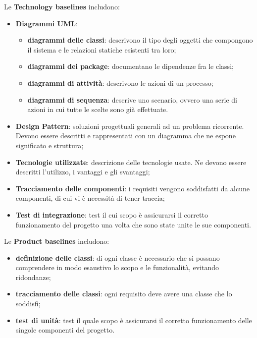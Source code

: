 Le \textbf{Technology baselines} includono:
\begin{itemize}
\item \textbf{Diagrammi UML}:
\begin{itemize}
\item \textbf{diagrammi delle classi}: descrivono il tipo degli oggetti che compongono il sistema e le relazioni statiche esistenti tra loro;
\item \textbf{diagrammi dei package}: documentano le dipendenze fra le classi;
\item \textbf{diagrammi di attività}: descrivono le azioni di un processo;
\item \textbf{diagrammi di sequenza}: descrive uno scenario, ovvero una serie di azioni in cui tutte le scelte sono già effettuate.
\end{itemize}
\item \textbf{Design Pattern}: soluzioni progettuali generali ad un problema ricorrente. Devono essere descritti e rappresentati con un diagramma che ne espone significato e struttura;
\item \textbf{Tecnologie utilizzate}: descrizione delle tecnologie usate. Ne devono essere descritti l'utilizzo, i vantaggi e gli svantaggi;
\item \textbf{Tracciamento delle componenti}: i requisiti vengono soddisfatti da alcune componenti, di cui vi è necessità di tener traccia;
\item \textbf{Test di integrazione}: test il cui scopo è assicurarsi il corretto funzionamento del progetto una volta che sono state unite le sue componenti.
\end{itemize}

Le \textbf{Product baselines} includono:
\begin{itemize}
\item \textbf{definizione delle classi}: di ogni classe è necessario che si possano comprendere in modo esaustivo lo scopo e le funzionalità, evitando ridondanze;
\item \textbf{tracciamento delle classi}: ogni requisito deve avere una classe che lo soddisfi; 
\item \textbf{test di unità}: test il quale scopo è assicurarsi il corretto funzionamento delle singole componenti del progetto.
\end{itemize}